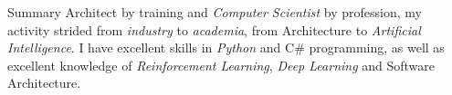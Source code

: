 \begin{rSection}{Summary}
    Architect by training and \emph{Computer Scientist} by profession, my activity strided from \emph{industry} to \emph{academia}, from Architecture to \emph{Artificial Intelligence}. I have excellent skills in \emph{Python} and C\# programming, as well as excellent knowledge of \emph{Reinforcement Learning}, \emph{Deep Learning} and Software Architecture.
\end{rSection}